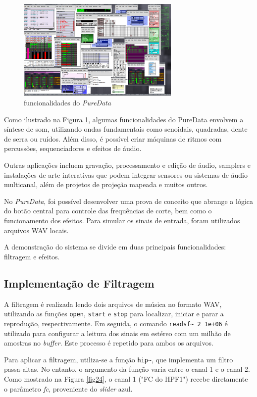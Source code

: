 \begin{figure}[h]
    \centering
    \includegraphics[width=0.7\textwidth]{figuras/fig78.png}
    \caption{funcionalidades do \textit{PureData}}
    \label{fig78}
\end{figure}

Como ilustrado na Figura \ref{fig78}, algumas funcionalidades do PureData envolvem a síntese de som, utilizando ondas fundamentais como senoidais, quadradas, dente de serra ou ruídos. Além disso, é possível criar máquinas de ritmos com percussões, sequenciadores e efeitos de áudio.

Outras aplicações incluem gravação, processamento e edição de áudio, samplers e instalações de arte interativas que podem integrar sensores ou sistemas de áudio multicanal, além de projetos de projeção mapeada e muitos outros.

No \textit{PureData}, foi possível desenvolver uma prova de conceito que abrange a lógica do botão central para controle das frequências de corte, bem como o funcionamento dos efeitos. Para simular os sinais de entrada, foram utilizados arquivos WAV locais.

A demonstração do sistema se divide em duas principais funcionalidades: filtragem e efeitos.

\subsection{Implementação de Filtragem}

A filtragem é realizada lendo dois arquivos de música no formato WAV, utilizando as funções \texttt{open}, \texttt{start} e \texttt{stop} para localizar, iniciar e parar a reprodução, respectivamente. Em seguida, o comando \texttt{readsf\textasciitilde\ 2 1e+06} é utilizado para configurar a leitura dos sinais em estéreo com um milhão de amostras no \textit{buffer}. Este processo é repetido para ambos os arquivos.

Para aplicar a filtragem, utiliza-se a função \texttt{hip\textasciitilde}, que implementa um filtro passa-altas. No entanto, o argumento da função varia entre o canal 1 e o canal 2. Como mostrado na Figura \ref{fig24}, o canal 1 ("FC do HPF1") recebe diretamente o parâmetro \textit{fc}, proveniente do \textit{slider} azul.

